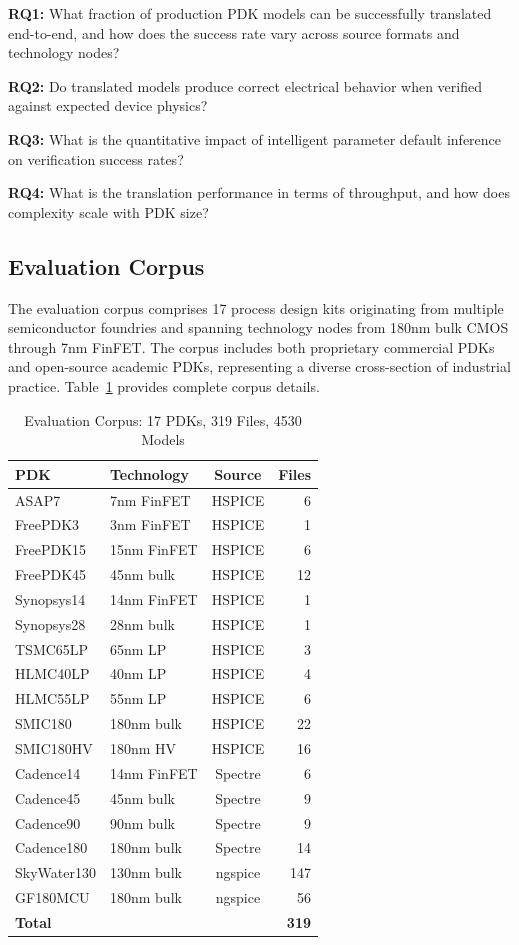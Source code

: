 \documentclass[10pt,twocolumn]{article}
\begin{document}
\textbf{RQ1:} What fraction of production PDK models can be successfully translated end-to-end, and how does the success rate vary across source formats and technology nodes?

\textbf{RQ2:} Do translated models produce correct electrical behavior when verified against expected device physics?

\textbf{RQ3:} What is the quantitative impact of intelligent parameter default inference on verification success rates?

\textbf{RQ4:} What is the translation performance in terms of throughput, and how does complexity scale with PDK size?

\subsection{Evaluation Corpus}

The evaluation corpus comprises 17 process design kits originating from multiple semiconductor foundries and spanning technology nodes from 180nm bulk CMOS through 7nm FinFET. The corpus includes both proprietary commercial PDKs and open-source academic PDKs, representing a diverse cross-section of industrial practice. Table~\ref{tab:corpus} provides complete corpus details.

\begin{table}[!t]
\caption{Evaluation Corpus: 17 PDKs, 319 Files, 4530 Models}
\label{tab:corpus}
\centering
\renewcommand{\arraystretch}{1.15}
\begin{tabular}{@{}llcr@{}}
\toprule
\textbf{PDK} & \textbf{Technology} & \textbf{Source} & \textbf{Files} \\
\midrule
ASAP7 & 7nm FinFET & HSPICE & 6 \\
FreePDK3 & 3nm FinFET & HSPICE & 1 \\
FreePDK15 & 15nm FinFET & HSPICE & 6 \\
FreePDK45 & 45nm bulk & HSPICE & 12 \\
Synopsys14 & 14nm FinFET & HSPICE & 1 \\
Synopsys28 & 28nm bulk & HSPICE & 1 \\
TSMC65LP & 65nm LP & HSPICE & 3 \\
HLMC40LP & 40nm LP & HSPICE & 4 \\
HLMC55LP & 55nm LP & HSPICE & 6 \\
SMIC180 & 180nm bulk & HSPICE & 22 \\
SMIC180HV & 180nm HV & HSPICE & 16 \\
Cadence14 & 14nm FinFET & Spectre & 6 \\
Cadence45 & 45nm bulk & Spectre & 9 \\
Cadence90 & 90nm bulk & Spectre & 9 \\
Cadence180 & 180nm bulk & Spectre & 14 \\
SkyWater130 & 130nm bulk & ngspice & 147 \\
GF180MCU & 180nm bulk & ngspice & 56 \\
\midrule
\textbf{Total} & & & \textbf{319} \\
\bottomrule
\end{tabular}
\end{table}
\end{document}
